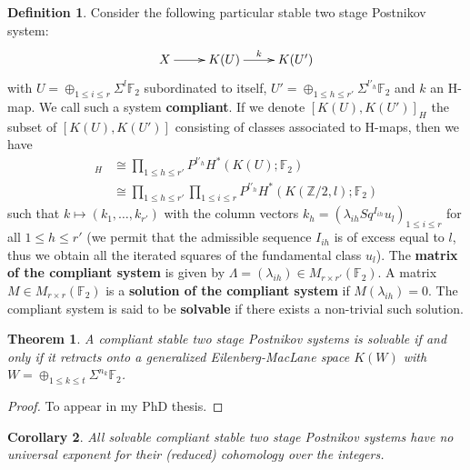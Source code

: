 \documentclass[11pt,a4paper]{amsart}
\theoremstyle{plain}
\newtheorem{thm}{Theorem}[section]
\newtheorem{cor}[thm]{Corollary}
\theoremstyle{definition}
\newtheorem{defn}{Definition}[section]
\theoremstyle{remark}
\newcommand{\Z}{\mathbb{Z}}
\newcommand{\F}{\mathbb{F}}
\renewcommand{\leq}{\leqslant}
\begin{document}
\begin{defn}
Consider the following particular stable two stage Postnikov system:
$$\xymatrix{
X\ar[r] &K(U)\ar[r]^-k &K(U')
}$$ with $U=\oplus_{1\leq i\leq r}\Sigma^{l}\F_2$ subordinated to itself, $U'=\oplus_{1\leq h\leq r'}\Sigma^{l'_h}\F_2$ and $k$ an H-map. We call such a system {\bf compliant}. If we denote $[K(U),K(U')]_H$ the subset of $[K(U),K(U')]$ consisting of classes associated to H-maps, then we have
\begin{align*}
[K(U),K(U')]_H &\cong\prod_{1\leq h\leq r'}P^{l'_h}H^*(K(U);\F_2)\\
&\cong \prod_{1\leq h\leq r'}\prod_{1\leq i\leq r}P^{l'_h}H^*(K(\Z/2,l);\F_2)
\end{align*} such that $k\mapsto (k_1,\dots,k_{r'})$ with the column vectors $k_h=(\lambda_{ih}Sq^{I_{ih}}u_l)_{1\leq i\leq r}$ for all $1\leq h\leq r'$ (we permit that the admissible sequence $I_{ih}$ is of excess equal to $l$, thus we obtain all the iterated squares of the fundamental class $u_l$). The {\bf matrix of the compliant system} is given by $\Lambda=(\lambda_{ih})\in M_{r\times r'}(\F_2)$. A matrix $M\in M_{r\times r}(\F_2)$ is a {\bf solution of the compliant system} if $M(\lambda_{ih})=0$. The compliant system is said to be {\bf solvable} if there exists a non-trivial such solution.
\end{defn}

\begin{thm}\label{t:retract}
A compliant stable two stage Postnikov systems is solvable if and only if it retracts onto a generalized Eilenberg-MacLane space $K(W)$ with $W=\oplus_{1\leq k\leq t}\Sigma^{n_k}\F_2$.
\end{thm}

\begin{proof}
To appear in my PhD thesis.
\end{proof}

\begin{cor}
All solvable compliant stable two stage Postnikov systems have no universal exponent for their (reduced) cohomology over the integers.
\end{cor}
\end{document}
